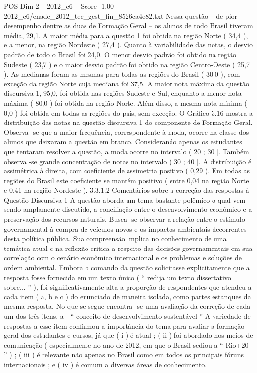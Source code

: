 \begin{textsample}{POS Dim 2 – 2012\_c6 – Score -1.00 – 2012\_c6/enade\_2012\_tec\_gest\_fin\_8526ca4e82.txt}
Nessa questão – de pior desempenho dentre as duas de Formação Geral – os alunos de todo Brasil tiveram média, 29,1.
A maior média para a questão 1 foi obtida na região Norte ( 34,4 ), e a menor, na região Nordeste ( 27,4 ).
Quanto à variabilidade das notas, o desvio padrão de todo o Brasil foi 24,0.
O menor desvio padrão foi obtido na região Sudeste ( 23,7 ) e o maior desvio padrão foi obtido na região Centro-Oeste ( 25,7 ).
As medianas foram as mesmas para todas as regiões do Brasil ( 30,0 ), com exceção da região Norte cuja mediana foi 37,5.
A maior nota máxima da questão discursiva 1, 95,0, foi obtida nas regiões Sudeste e Sul, enquanto a menor nota máxima ( 80,0 ) foi obtida na região Norte.
Além disso, a mesma nota mínima ( 0,0 ) foi obtida em todas as regiões do país, sem exceção.
O Gráfico 3.16 mostra a distribuição das notas na questão discursiva 1 do componente de Formação Geral.
Observa -se que a maior frequência, correspondente à moda, ocorre na classe dos alunos que deixaram a questão em branco.
Considerando apenas os estudantes que tentaram resolver a questão, a moda ocorre no intervalo ( 20 ; 30 ].
Também observa -se grande concentração de notas no intervalo ( 30 ; 40 ].
A distribuição é assimétrica à direita, com coeficiente de assimetria positivo ( 0,29 ).
Em todas as regiões do Brasil este coeficiente se mantém positivo ( entre 0,04 na região Norte e 0,41 na região Nordeste ). 3.3.1.2 Comentários sobre a correção das respostas à Questão Discursiva 1 A questão aborda um tema bastante polêmico o qual vem sendo amplamente discutido, a conciliação entre o desenvolvimento econômico e a preservação dos recursos naturais.
Busca -se observar a relação entre o estímulo governamental à compra de veículos novos e os impactos ambientais decorrentes desta política pública.
Sua compreensão implica no conhecimento de uma temática atual e na reflexão critica a respeito das decisões governamentais em sua correlação com o cenário econômico internacional e os problemas e soluções de ordem ambiental.
Embora o comando da questão solicitasse explicitamente que a resposta fosse fornecida em um texto único ( “ redija um texto dissertativo sobre... ” ), foi significativamente alta a proporção de respondentes que atendeu a cada item ( a, b e c ) do enunciado de maneira isolada, como partes estanques da mesma resposta.
No que se segue encontra -se uma avaliação da correção de cada um dos três itens. a - “ conceito de desenvolvimento sustentável ” A variedade de respostas a esse item confirmou a importância do tema para avaliar a formação geral dos estudantes e cursos, já que ( i ) é atual ; ( ii ) foi abordado nos meios de comunicação ( especialmente no ano de 2012, em que o Brasil sediou a “ Rio+20 ” ) ; ( iii ) é relevante não apenas no Brasil como em todos os principais fóruns internacionais ; e ( iv ) é comum a diversas áreas de conhecimento.

\end{textsample}
